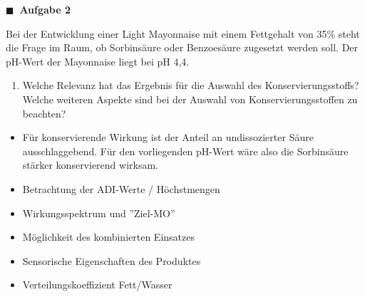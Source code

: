 \documentclass[aspectratio=169,9pt]{beamer}
\newcommand{\antwort}[1]{
\begin{tcolorbox}[
	enhanced,
	colframe=unigrau!65,
	sharp corners,
	boxsep=1pt,
	colback=white,
	coltitle=black,
]
	#1
	\end{tcolorbox}
}
\begin{document}
\begin{frame}

\begin{minipage}{.5\textwidth}
{\color{miugray}$\blacksquare ~$} \textbf{Aufgabe  2} \par \vspace*{2mm}

Bei der Entwicklung einer Light Mayonnaise mit einem Fettgehalt von 35\% steht die Frage im Raum, ob Sorbinsäure oder Benzoesäure zugesetzt werden soll. Der pH-Wert der Mayonnaise liegt bei pH 4,4.
\begin{enumerate}[label=\alph*)]
\item[b)] Welche Relevanz hat das Ergebnis für die Auswahl des Konservierungsstoffs? Welche
weiteren Aspekte sind bei der Auswahl von Konservierungsstoffen zu beachten?
\end{enumerate}



\end{minipage}%
\hspace*{4mm}
\begin{minipage}{.5\textwidth}

\antwort{
\begin{itemize}
\item[\color{miugray}$\blacktriangleright$]<2-> Für konservierende Wirkung ist der Anteil an undissozierter Säure ausschlaggebend. Für den vorliegenden pH-Wert wäre also die Sorbinsäure stärker konservierend wirksam.
\item[\color{miugray}$\blacktriangleright$]<3-> Betrachtung der ADI-Werte / Höchstmengen
\item[\color{miugray}$\blacktriangleright$]<4-> Wirkungsspektrum und ''Ziel-MO''
\item[\color{miugray}$\blacktriangleright$]<5-> Möglichkeit des kombinierten Einsatzes
\item[\color{miugray}$\blacktriangleright$]<6-> Sensorische Eigenschaften des Produktes
\item[\color{miugray}$\blacktriangleright$]<7-> Verteilungskoeffizient Fett/Wasser
\end{itemize}

}

\end{minipage}%

\end{frame}
\end{document}
